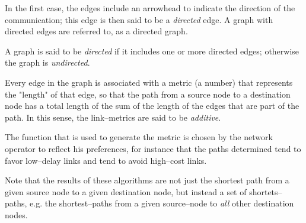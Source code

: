 In the
first case, the edges include an arrowhead to indicate the
direction of the communication; this edge is then said to be a
\emph{directed} edge. A graph with directed edges are referred to, as a directed graph.

A graph is said to be \emph{directed} if it includes one or more directed edges; otherwise the graph is \emph{undirected}.


Every edge in the graph is associated with a metric (a number)
that represents the "length" of that edge, so that the path from a
source node to a destination node has a total length of the sum of
the length of the edges that are part of the path. In this sense,
the link--metrics are said to be \emph{additive}.

The function that is used to generate the metric is chosen by the
network operator to reflect his preferences, for instance that the
paths determined tend to favor low--delay links and tend to avoid
high--cost links.

Note
that the results of these algorithms are not just the shortest path
from a given source node to a given destination node, but instead a
set of shortets--paths, e.g. the shortest--paths from a given
source--node to \emph{all} other destination nodes.

